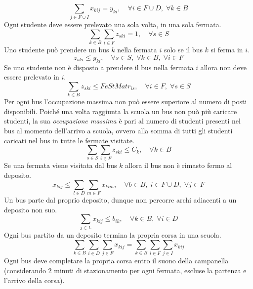 \begin{equation}
  \sum_{j \in F \cup I} x_{kij} = y_{ki},\quad \forall i \in F \cup D,\; \forall k \in B
\end{equation}
Ogni studente deve essere prelevato una sola volta, in una sola fermata.
\begin{equation}
    \sum_{k \in B}\sum_{i \in F} z_{ski} = 1,\quad \forall s \in S
\end{equation}
Uno studente può prendere un bus $k$ nella fermata $i$ solo se il bus $k$ si ferma in $i$.
\begin{equation}
    z_{ski} \leq y_{ki},\quad \forall s \in S,\;\forall k \in B,\;\forall i \in F
\end{equation}
Se uno studente non è disposto a prendere il bus nella fermata $i$ allora non deve essere prelevato in $i$.
\begin{equation}
    \sum_{k \in B} z_{ski} \leq FeStMatr_{is},\quad \forall i \in F,\;\forall s \in S
\end{equation}
Per ogni bus l'occupazione massima non può essere superiore al numero di posti disponibili. Poiché una volta raggiunta la scuola un bus non può più caricare studenti, la sua \textit{occupazione massima} è pari al numero di studenti presenti nel bus al momento dell'arrivo a scuola, ovvero alla somma di tutti gli studenti caricati nel bus in tutte le fermate visitate. 
\begin{equation}
    \sum_{s \in S}\sum_{i \in F}z_{ski} \leq C_{k},\quad \forall k \in B
\end{equation}
Se una fermata viene visitata dal bus $k$ allora il bus non è rimasto fermo al deposito.
\begin{equation}
    x_{kij} \leq \sum_{l \in D}\sum_{m \in F}x_{klm}, \quad \forall b \in B,\;i \in F \cup D,\;\forall j \in F
\end{equation}
Un bus parte dal proprio deposito, dunque non percorre archi adiacenti a un deposito non suo.
\begin{equation}
  \sum_{j \in L}x_{kij} \leq b_{ik}, \quad \forall k \in B,\;\forall i \in D
\end{equation}
Ogni bus partito da un deposito termina la propria corsa in una scuola.
\begin{equation}
  \sum_{k \in B}\sum_{i \in D}\sum_{j \in F} x_{kij} = \sum_{k \in B}\sum_{i \in F}\sum_{j \in I} x_{kij}
\end{equation}
Ogni bus deve completare la propria corsa entro il suono della campanella (considerando 2 minuti di stazionamento per ogni fermata, escluse la partenza e l'arrivo della corsa).
